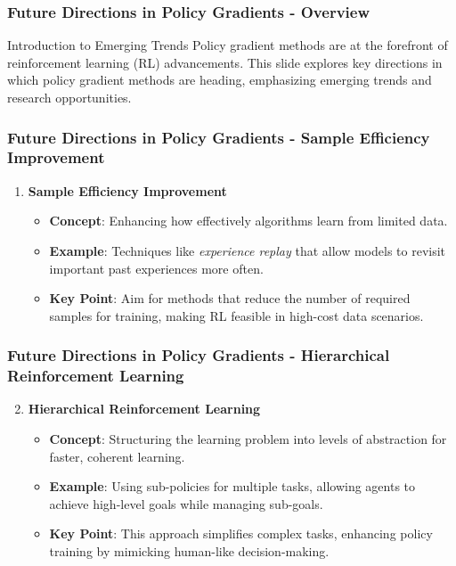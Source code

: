 \documentclass{beamer}
\begin{document}
\begin{frame}[fragile]
    \frametitle{Future Directions in Policy Gradients - Overview}
    \begin{block}{Introduction to Emerging Trends}
        Policy gradient methods are at the forefront of reinforcement learning (RL) advancements. This slide explores key directions in which policy gradient methods are heading, emphasizing emerging trends and research opportunities.
    \end{block}
\end{frame}

\begin{frame}[fragile]
    \frametitle{Future Directions in Policy Gradients - Sample Efficiency Improvement}
    \begin{enumerate}
        \item \textbf{Sample Efficiency Improvement}
            \begin{itemize}
                \item \textbf{Concept}: Enhancing how effectively algorithms learn from limited data.
                \item \textbf{Example}: Techniques like \textit{experience replay} that allow models to revisit important past experiences more often.
                \item \textbf{Key Point}: Aim for methods that reduce the number of required samples for training, making RL feasible in high-cost data scenarios.
            \end{itemize}
    \end{enumerate}
\end{frame}

\begin{frame}[fragile]
    \frametitle{Future Directions in Policy Gradients - Hierarchical Reinforcement Learning}
    \begin{enumerate}
        \setcounter{enumi}{1}
        \item \textbf{Hierarchical Reinforcement Learning}
            \begin{itemize}
                \item \textbf{Concept}: Structuring the learning problem into levels of abstraction for faster, coherent learning.
                \item \textbf{Example}: Using sub-policies for multiple tasks, allowing agents to achieve high-level goals while managing sub-goals.
                \item \textbf{Key Point}: This approach simplifies complex tasks, enhancing policy training by mimicking human-like decision-making.
            \end{itemize}
    \end{enumerate}
\end{frame}
\end{document}
